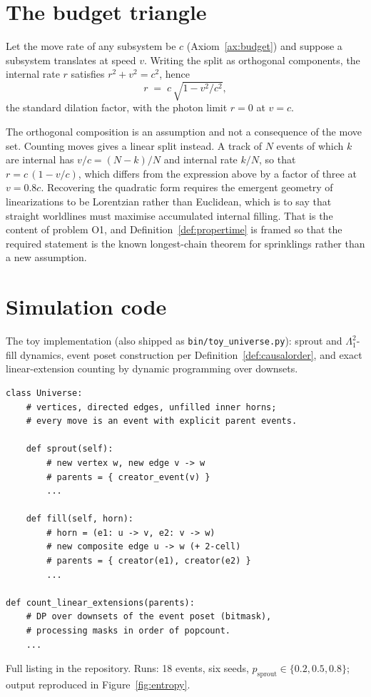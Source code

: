 \section{The budget triangle}
\label{app:budget}

Let the move rate of any subsystem be $c$ (Axiom~\ref{ax:budget}) and suppose
a subsystem translates at speed $v$. Writing the split as orthogonal
components, the internal rate $r$ satisfies $r^2 + v^2 = c^2$, hence
\[
  r \;=\; c\,\sqrt{1 - v^2/c^2},
\]
the standard dilation factor, with the photon limit $r = 0$ at $v = c$.

The orthogonal composition is an assumption and not a consequence of the
move set. Counting moves gives a linear split instead. A track of $N$ events
of which $k$ are internal has $v/c = (N-k)/N$ and internal rate $k/N$, so
that $r = c\,(1 - v/c)$, which differs from the expression above by a factor
of three at $v = 0.8c$. Recovering the quadratic form requires the emergent
geometry of linearizations to be Lorentzian rather than Euclidean, which is
to say that straight worldlines must maximise accumulated internal filling.
That is the content of problem O1, and Definition~\ref{def:propertime} is
framed so that the required statement is the known longest-chain theorem for
sprinklings rather than a new assumption.

\section{Simulation code}
\label{app:code}

The toy implementation (also shipped as \texttt{bin/toy\_universe.py}):
sprout and $\Lambda^2_1$-fill dynamics, event poset construction per
Definition~\ref{def:causalorder}, and exact linear-extension counting by
dynamic programming over downsets.

\lstset{language=Python, basicstyle=\ttfamily\footnotesize,
        breaklines=true, frame=single}
\begin{lstlisting}
class Universe:
    # vertices, directed edges, unfilled inner horns;
    # every move is an event with explicit parent events.

    def sprout(self):
        # new vertex w, new edge v -> w
        # parents = { creator_event(v) }
        ...

    def fill(self, horn):
        # horn = (e1: u -> v, e2: v -> w)
        # new composite edge u -> w (+ 2-cell)
        # parents = { creator(e1), creator(e2) }
        ...

def count_linear_extensions(parents):
    # DP over downsets of the event poset (bitmask),
    # processing masks in order of popcount.
    ...
\end{lstlisting}

Full listing in the repository. Runs: 18 events, six seeds,
$p_{\mathrm{sprout}} \in \{0.2, 0.5, 0.8\}$; output reproduced in
Figure~\ref{fig:entropy}.
